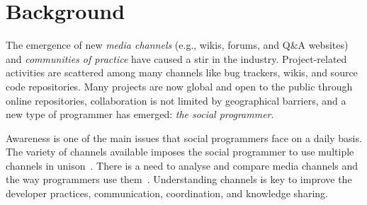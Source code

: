 \section{Background}
\label{cha:background}


    The emergence of new \textit{media channels} (e.g., wikis, forums, and Q\&A websites) and \textit{communities of practice} have caused a stir in the industry.
    Project-related activities are scattered among many channels like bug trackers, wikis, and source code repositories.%
    Many projects are now global and open to the public through online repositories, collaboration is not limited by geographical barriers, and a new type of programmer has emerged: \textit{the social programmer}.

    Awareness is one of the main issues that social programmers face on a daily basis.
    The variety of channels available imposes the social programmer to use multiple channels in unison~\cite{Storey2010, Storey2014}.
There is a need to analyse and compare media channels and the way programmers use them~\cite{Vasilescu2014b}.
Understanding channels is key to improve the developer practices, communication, coordination, and knowledge sharing.
    

